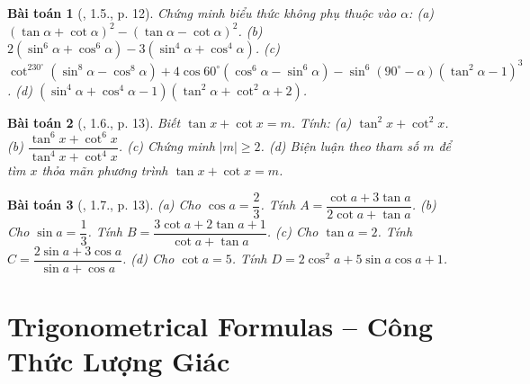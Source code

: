 \documentclass{article}
\newtheorem{baitoan}{Bài toán}
\begin{document}
\begin{baitoan}[\cite{Hung_nang_cao_phat_trien_Toan_11_tap_1}, 1.5., p. 12]
	Chứng minh biểu thức không phụ thuộc vào $\alpha$: (a) $(\tan\alpha + \cot\alpha)^2 - (\tan\alpha - \cot\alpha)^2$. (b) $2(\sin^6\alpha + \cos^6\alpha) - 3(\sin^4\alpha + \cos^4\alpha)$. (c) $\cot^230^\circ(\sin^8\alpha - \cos^8\alpha) + 4\cos60^\circ(\cos^6\alpha - \sin^6\alpha) - \sin^6(90^\circ - \alpha)(\tan^2\alpha - 1)^3$. (d) $(\sin^4\alpha + \cos^4\alpha - 1)(\tan^2\alpha + \cot^2\alpha + 2)$.
\end{baitoan}

\begin{baitoan}[\cite{Hung_nang_cao_phat_trien_Toan_11_tap_1}, 1.6., p. 13]
	Biết $\tan x + \cot x = m$. Tính: (a) $\tan^2x + \cot^2x$. (b) $\dfrac{\tan^6x + \cot^6x}{\tan^4x + \cot^4x}$. (c) Chứng minh $|m|\ge2$. (d) Biện luận theo tham số $m$ để tìm $x$ thỏa mãn phương trình $\tan x + \cot x = m$.
\end{baitoan}

\begin{baitoan}[\cite{Hung_nang_cao_phat_trien_Toan_11_tap_1}, 1.7., p. 13]
	(a) Cho $\cos a = \dfrac{2}{3}$. Tính $A = \dfrac{\cot a + 3\tan a}{2\cot a + \tan a}$. (b) Cho $\sin a = \dfrac{1}{3}$. Tính $B = \dfrac{3\cot a + 2\tan a + 1}{\cot a + \tan a}$. (c) Cho $\tan a = 2$. Tính $C = \dfrac{2\sin a + 3\cos a}{\sin a + \cos a}$. (d) Cho $\cot a = 5$. Tính $D = 2\cos^2a + 5\sin a\cos a + 1$.
\end{baitoan}


\section{Trigonometrical Formulas -- Công Thức Lượng Giác}


\printbibliography[heading=bibintoc]
	
\end{document}
